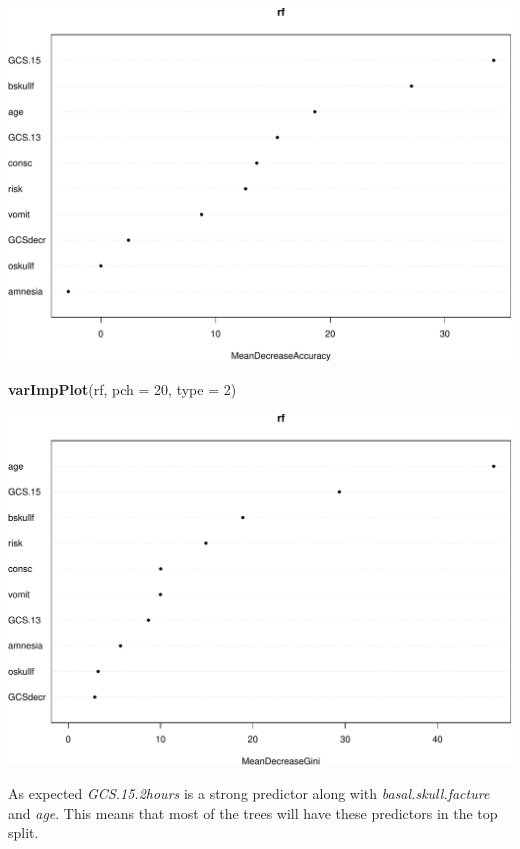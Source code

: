 \documentclass[ignorenonframetext,]{beamer}
\newenvironment{Shaded}{\begin{snugshade}}{\end{snugshade}}
\newcommand{\KeywordTok}[1]{\textcolor[rgb]{0.13,0.29,0.53}{\textbf{#1}}}
\newcommand{\DataTypeTok}[1]{\textcolor[rgb]{0.13,0.29,0.53}{#1}}
\newcommand{\DecValTok}[1]{\textcolor[rgb]{0.00,0.00,0.81}{#1}}
\newcommand{\NormalTok}[1]{#1}
\begin{document}
\begin{frame}[fragile]
\includegraphics{8TreesBEAMER_files/figure-beamer/unnamed-chunk-35-2.pdf}

\begin{Shaded}
\begin{Highlighting}[]
\KeywordTok{varImpPlot}\NormalTok{(rf, }\DataTypeTok{pch =} \DecValTok{20}\NormalTok{, }\DataTypeTok{type =} \DecValTok{2}\NormalTok{)}
\end{Highlighting}
\end{Shaded}

\includegraphics{8TreesBEAMER_files/figure-beamer/unnamed-chunk-35-3.pdf}

As expected \emph{GCS.15.2hours} is a strong predictor along with
\emph{basal.skull.facture} and \emph{age}. This means that most of the
trees will have these predictors in the top split.

\end{frame}
\end{document}
